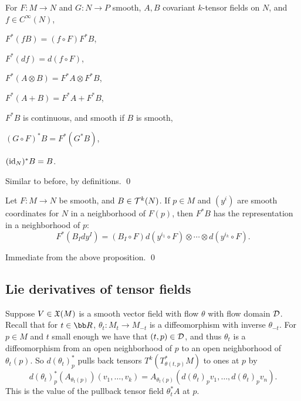 \edefn

\bprop

    For $F\colon M\to N$ and $G\colon N\to P$ smooth, $A,B$ covariant $k$-tensor fields on $N$, and $f\in C^\infty(N)$,
    \benum
        \item $F^*(fB)=(f\circ F)F^*B$,
        \item $F^*(df)=d(f\circ F)$,
        \item $F^*(A\otimes B)=F^*A\otimes F^*B$,
        \item $F^*(A+B)=F^*A+F^*B$,
        \item $F^*B$ is continuous, and smooth if $B$ is smooth,
        \item $(G\circ F)^*B=F^*(G^*B)$,
        \item $({\rm id}_N)^*B=B$.
    \eenum

\eprop

\bproof

    Similar to before, by definitions.
    \qed

\eproof

\bcoro

    Let $F\colon M\to N$ be smooth, and $B\in{{\cal T}}^k(N)$.
    If $p\in M$ and $(y^i)$ are smooth coordinates for $N$ in a neighborhood of $F(p)$, then $F^*B$ has the representation in a neighborhood of $p$:
    $$ F^*(B_Idy^I) = (B_I\circ F)d(y^{i_1}\circ F)\otimes\cdots\otimes d(y^{i_k}\circ F) . $$

\ecoro

\bproof

    Immediate from the above proposition.
    \qed

\eproof

\subsection{Lie derivatives of tensor fields}

Suppose $V\in{\frak X}(M)$ is a smooth vector field with flow $\theta$ with flow domain ${{\cal D}}$.
Recall that for $t\in\bR$, $\theta_t\colon M_t\to M_{-t}$ is a diffeomorphism with inverse $\theta_{-t}$.
For $p\in M$ and $t$ small enough we have that $(t,p)\in{{\cal D}}$, and thus $\theta_t$ is a diffeomorphism from an open neighborhood of $p$ to an
open neighborhood of $\theta_t(p)$.
So $d(\theta_t)_p^*$ pulls back tensors $T^k(T^*_{\theta(t,p)}M)$ to ones at $p$ by
$$ d(\theta_t)^*_p(A_{\theta_t(p)})(v_1,\dots,v_k) = A_{\theta_t(p)}(d(\theta_t)_pv_1,\dots,d(\theta_t)_pv_n) . $$
This is the value of the pullback tensor field $\theta_t^*A$ at $p$.

